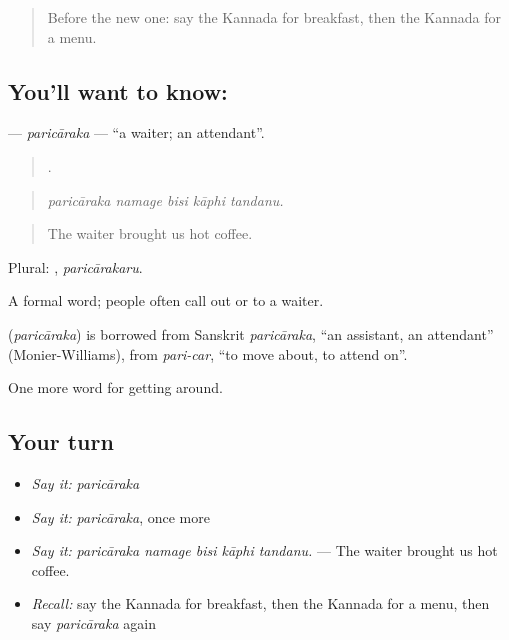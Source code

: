 \begin{quote}
Before the new one: say the Kannada for breakfast, then the Kannada for a menu.
\end{quote}

\subsection*{You'll want to know: }
\textbf{} — \emph{paricāraka} — \textquotedblleft{}a waiter; an attendant\textquotedblright{}.

\begin{quote}
    .
\end{quote}

\begin{quote}
\emph{paricāraka namage bisi kāphi tandanu.}
\end{quote}

\begin{quote}
The waiter brought us hot coffee.
\end{quote}

Plural: , \emph{paricārakaru}.

A formal word; people often call out  or  to a waiter.

\begin{cousinweb}
\textbf{} (\emph{paricāraka}) is borrowed from Sanskrit \emph{paricāraka}, \textquotedblleft{}an assistant, an attendant\textquotedblright{} (Monier-Williams), from \emph{pari-car}, \textquotedblleft{}to move about, to attend on\textquotedblright{}.
\end{cousinweb}

\begin{grammarlens}[title={What you've built}]
One more word for getting around.
\end{grammarlens}

\subsection*{Your turn}
\begin{itemize}
\raggedright
  \item \emph{Say it:} \emph{paricāraka}
  \item \emph{Say it:} \emph{paricāraka}, once more
  \item \emph{Say it:} \emph{paricāraka namage bisi kāphi tandanu.} — The waiter brought us hot coffee.
  \item \emph{Recall:} say the Kannada for breakfast, then the Kannada for a menu, then say \emph{paricāraka} again
\end{itemize}

